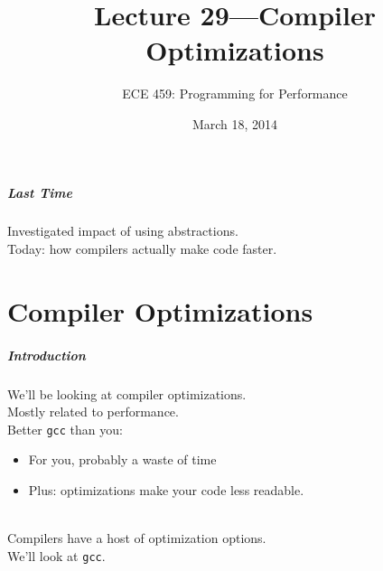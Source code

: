 \documentclass[aspectratio=43]{beamer}
\title{Lecture 29---Compiler Optimizations}
\subtitle{ECE 459: Programming for Performance}
\date{March 18, 2014}
\newenvironment{changemargin}[1]{%
  \begin{list}{}{%
    \setlength{\topsep}{0pt}%
    \setlength{\leftmargin}{#1}%
    \setlength{\rightmargin}{1em}
    \setlength{\listparindent}{\parindent}%
    \setlength{\itemindent}{\parindent}%
    \setlength{\parsep}{\parskip}%
  }%
  \item[]}{\end{list}}
\begin{document}
\begin{frame}[plain]
  \titlepage
\end{frame}

\begin{frame}
  \frametitle{Last Time}
  \begin{changemargin}{1cm}
    Investigated impact of using abstractions.\\[1em]
    Today: how compilers actually make code faster.
  \end{changemargin}
\end{frame}

\part{Compiler Optimizations}
\frame{\partpage}

\begin{frame}
  \frametitle{Introduction}

  \begin{changemargin}{2cm}
    We'll be looking at compiler optimizations.\\[1em]
    Mostly related to performance.\\
    Better {\tt gcc} than you:
      \begin{itemize}
        \item For you, probably a waste of time
        \item Plus: optimizations make your code less readable.
      \end{itemize}
~\\

    Compilers have a host of optimization options.\\
     We'll look at {\tt gcc}.
  \end{changemargin}
\end{frame}
\end{document}
